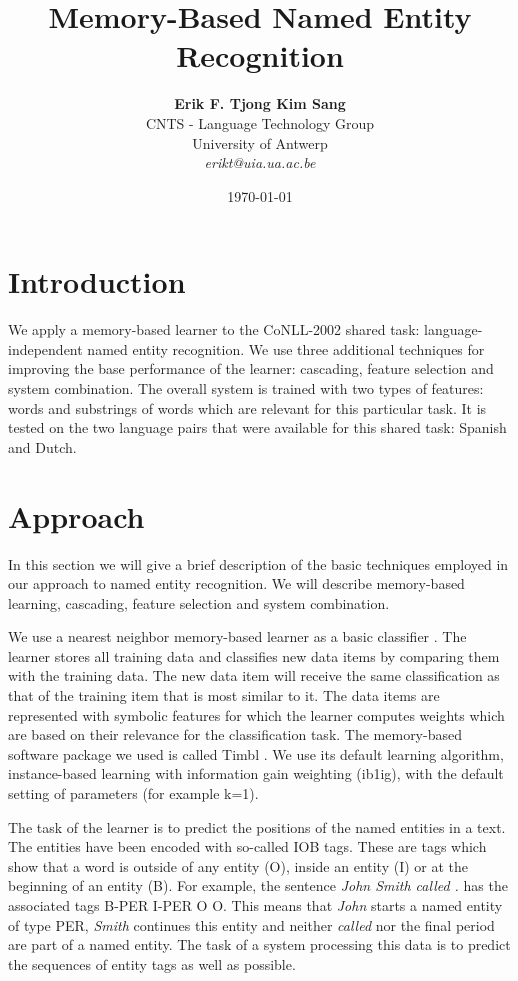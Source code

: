\documentclass[11pt]{article}
\title{{\bf Memory-Based Named Entity Recognition}}
\author{
\begin{tabular}{cc}
{\bf Erik F. Tjong Kim Sang}\\
CNTS - Language Technology Group\\
University of Antwerp\\
{\it erikt@uia.ua.ac.be}
\end{tabular}
}
\date{\today}
\begin{document}
\maketitle

\section{Introduction}

We apply a memory-based learner to the CoNLL-2002 shared task:
language-independent named entity recognition.
We use three additional techniques for improving the base performance
of the learner: cascading, feature selection and system combination.
The overall system is trained with two types of features: words and
substrings of words which are relevant for this particular task.
It is tested on the two language pairs that were available for this
shared task: Spanish and Dutch.

\section{Approach}

In this section we will give a brief description of the basic
techniques employed in our approach to named entity recognition.
We will describe memory-based learning, cascading, feature selection
and system combination.

We use a nearest neighbor memory-based learner as a basic classifier
\cite{timbl2001}.
The learner stores all training data and classifies new data items by
comparing them with the training data.
The new data item will receive the same classification as that of the
training item that is most similar to it.
The data items are represented with symbolic features for which
the learner computes weights which are based on their relevance for
the classification task.
The memory-based software package we used is called Timbl
\cite{timbl2001}.
We use its default learning algorithm, instance-based learning with
information gain weighting ({\sc ib1ig}), with the default setting
of parameters (for example k=1).

The task of the learner is to predict the positions of the named
entities in a text.
The entities have been encoded with so-called IOB tags.
These are tags which show that a word is outside of any entity (O),
inside an entity (I) or at the beginning of an entity (B).
For example, the sentence {\it John Smith called .} has the associated
tags B-PER I-PER O O.
This means that {\it John} starts a named entity of type PER, {\it
Smith} continues this entity and neither {\it called} nor the final
period are part of a named entity.
The task of a system processing this data is to predict the sequences
of entity tags as well as possible.
\end{document}
